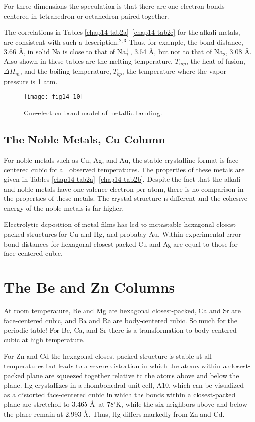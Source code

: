 For three dimensions the speculation is that there are one-electron bonds 
centered in tetrahedron or octahedron paired together.

The correlations in Tables \ref{chap14-tab2a}--\ref{chap14-tab2c} for
the alkali metals, are consistent with such a description.$^{2,3}$
Thus, for example, the bond distance, 3.66 \AA, in solid Na is close
to that of Na$^+_2$, 3.54 \AA, but not to that of Na$_2$, 3.08 \AA.
Also shown in these tables are the melting temperature, $T_{mp}$, the
heat of fusion, $\Delta H_m$, and the boiling temperature, $T_{bp}$,
the temperature where the vapor pressure is 1 atm.

\begin{figure}
\texttt{[image: fig14-10]}
\caption{One-electron bond model of metallic bonding.}
\label{chap14-fig9}
\end{figure}

\subsection{The Noble Metals, Cu Column}

For noble metals such as Cu, Ag, and Au, the stable crystalline format
is face-centered cubic for all observed temperatures.  The properties
of these metals are given in Tables
\ref{chap14-tab2a}--\ref{chap14-tab2b}.  Despite the fact that the
alkali and noble metals have one valence electron per atom, there is
no comparison in the properties of these metals. The crystal structure
is different and the cohesive energy of the noble metals is far
higher.

Electrolytic deposition of metal films has led to metastable hexagonal 
closest-packed structures for Cu and Hg, and probably Au.  Within 
experimental error bond distances for hexagonal closest-packed Cu and 
Ag are equal to those for face-centered cubic.

\section{The Be and Zn Columns}

At room temperature, Be and Mg are hexagonal closest-packed, Ca and Sr are 
face-centered cubic, and Ba and Ra are body-centered cubic. So
much for the periodic table!  For Be, Ca, and Sr there is a transformation to 
body-centered cubic at high temperature.

For Zn and Cd the hexagonal closest-packed structure is stable at all 
temperatures but leads to a severe distortion in which the atoms within 
a closest-packed plane are squeezed together relative to the
atoms above and below the plane.  Hg crystallizes in a rhombohedral unit 
cell, A10, which can be visualized as a distorted face-centered cubic in 
which the bonds within a closest-packed plane are stretched to
3.465 \AA\ at 78$^{\circ}$K, while the six neighbors above and below the 
plane remain at 2.993 \AA.  Thus, Hg differs markedly from Zn and Cd.

